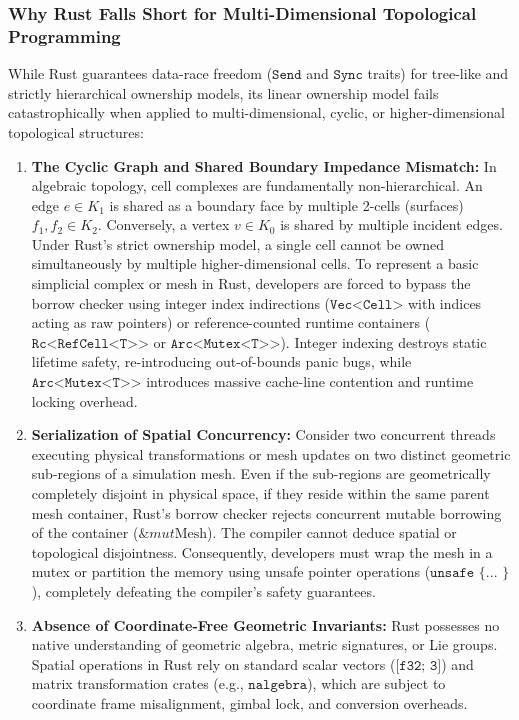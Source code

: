 \subsubsection{Why Rust Falls Short for Multi-Dimensional Topological Programming}
While Rust guarantees data-race freedom ($\texttt{Send}$ and $\texttt{Sync}$ traits) for tree-like and strictly hierarchical ownership models, its linear ownership model fails catastrophically when applied to multi-dimensional, cyclic, or higher-dimensional topological structures:

\begin{enumerate}[leftmargin=1.2cm]
    \item \textbf{The Cyclic Graph and Shared Boundary Impedance Mismatch:}  
    In algebraic topology, cell complexes are fundamentally non-hierarchical. An edge $e \in K_1$ is shared as a boundary face by multiple 2-cells (surfaces) $f_1, f_2 \in K_2$. Conversely, a vertex $v \in K_0$ is shared by multiple incident edges. Under Rust's strict ownership model, a single cell cannot be owned simultaneously by multiple higher-dimensional cells. To represent a basic simplicial complex or mesh in Rust, developers are forced to bypass the borrow checker using integer index indirections ($\texttt{Vec<Cell>}$ with indices acting as raw pointers) or reference-counted runtime containers ($\texttt{Rc<RefCell<T>>}$ or $\texttt{Arc<Mutex<T>>}$). Integer indexing destroys static lifetime safety, re-introducing out-of-bounds panic bugs, while $\texttt{Arc<Mutex<T>>}$ introduces massive cache-line contention and runtime locking overhead.

    \item \textbf{Serialization of Spatial Concurrency:}  
    Consider two concurrent threads executing physical transformations or mesh updates on two distinct geometric sub-regions of a simulation mesh. Even if the sub-regions are geometrically completely disjoint in physical space, if they reside within the same parent mesh container, Rust's borrow checker rejects concurrent mutable borrowing of the container ($\&mut \text{Mesh}$). The compiler cannot deduce spatial or topological disjointness. Consequently, developers must wrap the mesh in a mutex or partition the memory using unsafe pointer operations ($\texttt{unsafe \{ ... \}}$), completely defeating the compiler's safety guarantees.

    \item \textbf{Absence of Coordinate-Free Geometric Invariants:}  
    Rust possesses no native understanding of geometric algebra, metric signatures, or Lie groups. Spatial operations in Rust rely on standard scalar vectors ($\texttt{[f32; 3]}$) and matrix transformation crates (e.g., $\texttt{nalgebra}$), which are subject to coordinate frame misalignment, gimbal lock, and conversion overheads.
\end{enumerate}

